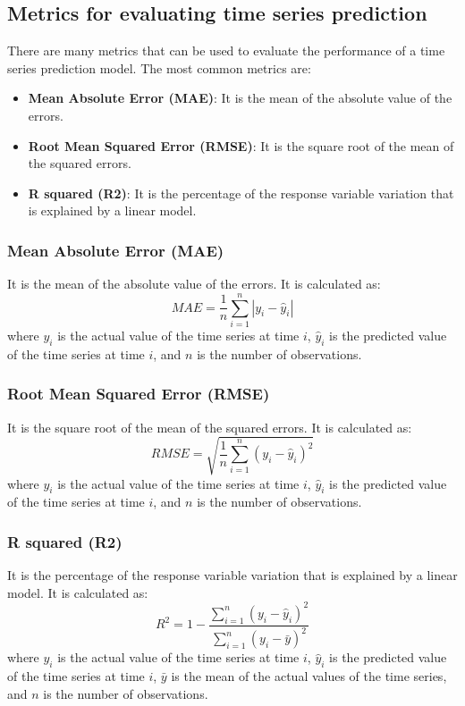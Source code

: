 \documentclass[manuscript,screen,nonacm,11pt]{acmart}                                                          %
\numberwithin{equation}{section}
\begin{document}
\subsection{Metrics for evaluating time series prediction}
\label{sec:metrics}
There are many metrics that can be used to evaluate the performance of a time series prediction model. The most common metrics are:
\begin{itemize}
\item \textbf{Mean Absolute Error (MAE)}: It is the mean of the absolute value of the errors. 
\item \textbf{Root Mean Squared Error (RMSE)}: It is the square root of the mean of the squared errors. 
\item \textbf{R squared (R2)}: It is the percentage of the response variable variation that is explained by a linear model. 
\end{itemize}

\subsubsection{Mean Absolute Error (MAE)}
It is the mean of the absolute value of the errors. It is calculated as:
\begin{equation}
\label{eq:mae}
MAE = \frac{1}{n}\sum_{i=1}^{n} |y_i - \hat{y}_i|
\end{equation}
where $y_i$ is the actual value of the time series at time $i$, $\hat{y}_i$ is the predicted value of the time series at time $i$, and $n$ is the number of observations.

\subsubsection{Root Mean Squared Error (RMSE)}
It is the square root of the mean of the squared errors. It is calculated as:
\begin{equation}
\label{eq:rmse}
RMSE = \sqrt{\frac{1}{n}\sum_{i=1}^{n} (y_i - \hat{y}_i)^2}
\end{equation}
where $y_i$ is the actual value of the time series at time $i$, $\hat{y}_i$ is the predicted value of the time series at time $i$, and $n$ is the number of observations.

\subsubsection{R squared (R2)}
It is the percentage of the response variable variation that is explained by a linear model. It is calculated as:
\begin{equation}
\label{eq:r2}
R^2 = 1 - \frac{\sum_{i=1}^{n} (y_i - \hat{y}_i)^2}{\sum_{i=1}^{n} (y_i - \bar{y})^2}
\end{equation}
where $y_i$ is the actual value of the time series at time $i$, $\hat{y}_i$ is the predicted value of the time series at time $i$, $\bar{y}$ is the mean of the actual values of the time series, and $n$ is the number of observations.
\end{document}
